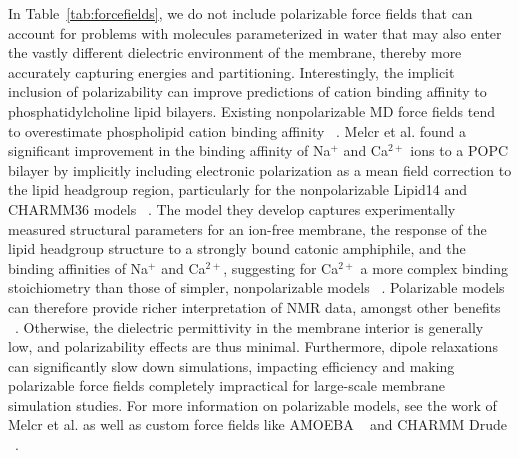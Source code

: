 \documentclass[9pt,bestpractices,pubversion]{livecoms}
\begin{document}
In Table~\ref{tab:forcefields}, we do not include polarizable force fields that can account for problems with molecules parameterized in water that may also enter the vastly different dielectric environment of the membrane, thereby more accurately capturing energies and partitioning.
Interestingly, the implicit inclusion of polarizability can improve predictions of cation binding affinity to phosphatidylcholine lipid bilayers.
Existing nonpolarizable MD force fields tend to overestimate phospholipid cation binding affinity ~\cite{Melcr2018}.
Melcr et al. found a significant improvement in the binding affinity of Na$^+$ and Ca$^{2+}$ ions to a POPC bilayer by implicitly including electronic polarization as a mean field correction to the lipid headgroup region, particularly for the nonpolarizable Lipid14 and CHARMM36 models ~\cite{Melcr2018}.
The model they develop captures experimentally measured structural parameters for an ion-free membrane, the response of the lipid headgroup structure to a strongly bound catonic amphiphile, and the binding affinities of Na$^+$ and Ca$^{2+}$, suggesting for Ca$^{2+}$ a more complex binding stoichiometry than those of simpler, nonpolarizable models ~\cite{Melcr2018}.
Polarizable models can therefore provide richer interpretation of NMR data, amongst other benefits ~\cite{Melcr2018}.
Otherwise, the dielectric permittivity in the membrane interior is generally low, and polarizability effects are thus minimal.
Furthermore, dipole relaxations can significantly slow down simulations, impacting efficiency and making polarizable force fields completely impractical for large-scale membrane simulation studies.
For more information on polarizable models, see the work of Melcr et al. as well as custom force fields like AMOEBA ~\cite{Ponder2010} and CHARMM Drude ~\cite{Vanommeslaeghe2015}.
\end{document}
